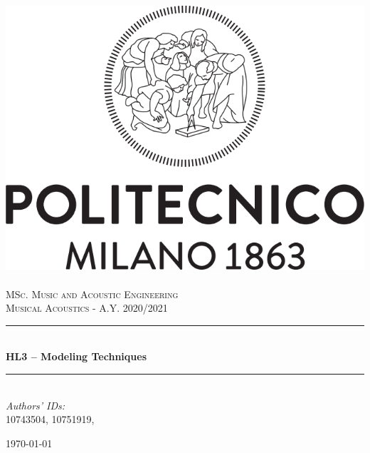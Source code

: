 \documentclass[a4paper]{article}
\title{}
\author{}
\begin{document}
\begin{titlepage}	
	\newcommand{\HRule}{\rule{\linewidth}{0.5mm}} %
	
	\center %
	
	
	\includegraphics[width=.4\textwidth]{Logo_Politecnico_Milano.png}\\[0.4cm]
	\textsc{\LARGE}\\[0.3cm] %
	
	\textsc{\large MSc. Music and Acoustic Engineering}\\[1cm] %
	
	\textsc{\Large Musical Acoustics - A.Y. 2020/2021}\\[0.5cm] %
	
	
	\HRule\\[0.4cm]
	
	{\huge\bfseries HL3 – Modeling Techniques}\\[0.4cm] %
	
	\HRule\\[1.5cm]
	
	
	
	{\large\textit{Authors' IDs:}}\\
	10743504, 10751919, %
	
	
	\vfill\vfill\vfill %
	
	{\large\today} %
	
	
	\vfill\vfill
	
	
	\vfill %
	
	
\end{titlepage}
\end{document}
